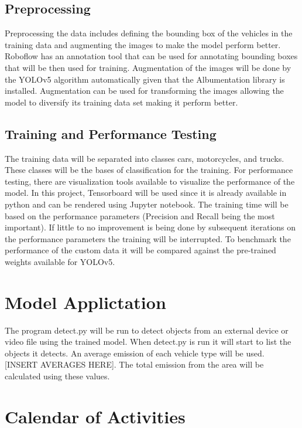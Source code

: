 \subsection {Preprocessing}

	Preprocessing the data includes defining the bounding box of the vehicles in the training data and augmenting the images to make the model perform better. Roboflow has an annotation tool that can be used for annotating bounding boxes that will be then used for training. Augmentation of the images will be done by the YOLOv5 algorithm automatically given that the Albumentation library is installed. Augmentation can be used for transforming the images allowing the model to diversify its training data set making it perform better. 


\subsection {Training and Performance Testing}

The training data will be separated into classes cars, motorcycles, and trucks. These classes will be the bases of classification for the training.  For performance testing, there are visualization tools available to visualize the performance of the model. In this project, Tensorboard will be used since it is already available in python and can be rendered using Jupyter notebook. The training time will be based on the performance parameters (Precision and Recall being the most important). If little to no improvement is being done by subsequent iterations on the performance parameters the training will be interrupted. To benchmark the performance of the custom data it will be compared against the pre-trained weights available for YOLOv5. 

\section {Model Applictation}
The program detect.py will be run to detect objects from an external device or video file using the trained model. When detect.py is run it will start to list the objects it detects. An average emission of each vehicle type will be used. [INSERT AVERAGES HERE]. The total emission from the area will be calculated using these values.


\section{Calendar of Activities}

